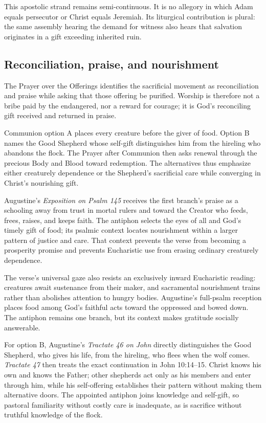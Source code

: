 This apostolic strand remains semi-continuous. It is no allegory in which Adam equals persecutor or Christ equals Jeremiah. Its liturgical contribution is plural: the same assembly hearing the demand for witness also hears that salvation originates in a gift exceeding inherited ruin.

\subsection*{Reconciliation, praise, and nourishment\enspace{}}

The Prayer over the Offerings identifies the sacrificial movement as reconciliation and praise while asking that those offering be purified. Worship is therefore not a bribe paid by the endangered, nor a reward for courage; it is God's reconciling gift received and returned in praise.

Communion option A places every creature before the giver of food. Option B names the Good Shepherd whose self-gift distinguishes him from the hireling who abandons the flock. The Prayer after Communion then asks renewal through the precious Body and Blood toward redemption. The alternatives thus emphasize either creaturely dependence or the Shepherd's sacrificial care while converging in Christ's nourishing gift.

Augustine's \emph{Exposition on Psalm 145} receives the first branch's praise as a schooling away from trust in mortal rulers and toward the Creator who feeds, frees, raises, and keeps faith. The antiphon selects the eyes of all and God's timely gift of food; its psalmic context locates nourishment within a larger pattern of justice and care. That context prevents the verse from becoming a prosperity promise and prevents Eucharistic use from erasing ordinary creaturely dependence.

The verse's universal gaze also resists an exclusively inward Eucharistic reading: creatures await sustenance from their maker, and sacramental nourishment trains rather than abolishes attention to hungry bodies. Augustine's full-psalm reception places food among God's faithful acts toward the oppressed and bowed down. The antiphon remains one branch, but its context makes gratitude socially answerable.

For option B, Augustine's \emph{Tractate 46 on John} directly distinguishes the Good Shepherd, who gives his life, from the hireling, who flees when the wolf comes. \emph{Tractate 47} then treats the exact continuation in John 10:14--15. Christ knows his own and knows the Father; other shepherds act only as his members and enter through him, while his self-offering establishes their pattern without making them alternative doors. The appointed antiphon joins knowledge and self-gift, so pastoral familiarity without costly care is inadequate, as is sacrifice without truthful knowledge of the flock.

